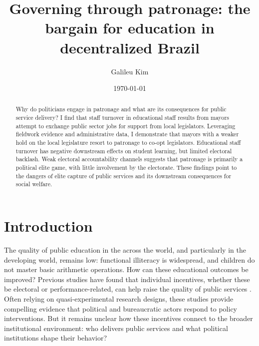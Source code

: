\documentclass[12pt,a4paper]{article}
\title{Governing through patronage: the bargain for education in decentralized Brazil}
\date{\today}
\author{Galileu Kim}
\affil{Princeton University}
\begin{document}
\maketitle

\begin{abstract}
    Why do politicians engage in patronage and what are its consequences for public service delivery? I find that staff turnover in educational staff results from mayors attempt to exchange public sector jobs for support from local legislators. Leveraging fieldwork evidence and administrative data, I demonstrate that mayors with a weaker hold on the local legislature resort to patronage to co-opt legislators. Educational staff turnover has negative downstream effects on student learning, but limited electoral backlash. Weak electoral accountability channels suggests that patronage is primarily a political elite game, with little involvement by the electorate. These findings point to the dangers of elite capture of public services and its downstream consequences for social welfare.
\end{abstract}

\newpage
\section{Introduction}


The quality of public education in the across the world, and particularly in the developing world, remains low: functional illiteracy is widespread, and children do not master basic arithmetic operations. How can these educational outcomes be improved? Previous studies have found that individual incentives, whether these be electoral or performance-related, can help raise the quality of public services \citep{gulzar_politicians_2017,duflo_incentives_2012}. Often relying on quasi-experimental research designs, these studies provide compelling evidence that political and bureaucratic actors respond to policy interventions.\citep{finan_personnel_2015} But it remains unclear how these incentives connect to the broader institutional environment: who delivers public services and what political institutions shape their behavior?
\end{document}
